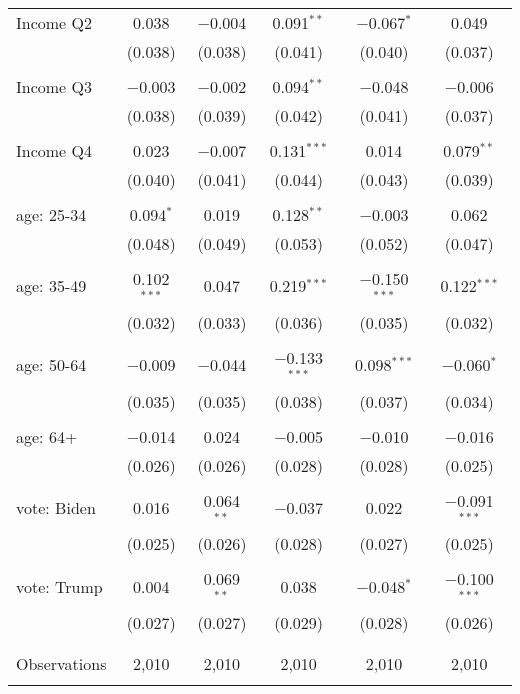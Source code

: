 \begin{tabular}{@{\extracolsep{5pt}}lccccc}
 Income Q2 & 0.038 & $-$0.004 & 0.091$^{**}$ & $-$0.067$^{*}$ & 0.049 \\ 
  & (0.038) & (0.038) & (0.041) & (0.040) & (0.037) \\ 
  & & & & & \\ 
 Income Q3 & $-$0.003 & $-$0.002 & 0.094$^{**}$ & $-$0.048 & $-$0.006 \\ 
  & (0.038) & (0.039) & (0.042) & (0.041) & (0.037) \\ 
  & & & & & \\ 
 Income Q4 & 0.023 & $-$0.007 & 0.131$^{***}$ & 0.014 & 0.079$^{**}$ \\ 
  & (0.040) & (0.041) & (0.044) & (0.043) & (0.039) \\ 
  & & & & & \\ 
 age: 25-34 & 0.094$^{*}$ & 0.019 & 0.128$^{**}$ & $-$0.003 & 0.062 \\ 
  & (0.048) & (0.049) & (0.053) & (0.052) & (0.047) \\ 
  & & & & & \\ 
 age: 35-49 & 0.102$^{***}$ & 0.047 & 0.219$^{***}$ & $-$0.150$^{***}$ & 0.122$^{***}$ \\ 
  & (0.032) & (0.033) & (0.036) & (0.035) & (0.032) \\ 
  & & & & & \\ 
 age: 50-64 & $-$0.009 & $-$0.044 & $-$0.133$^{***}$ & 0.098$^{***}$ & $-$0.060$^{*}$ \\ 
  & (0.035) & (0.035) & (0.038) & (0.037) & (0.034) \\ 
  & & & & & \\ 
 age: 64+ & $-$0.014 & 0.024 & $-$0.005 & $-$0.010 & $-$0.016 \\ 
  & (0.026) & (0.026) & (0.028) & (0.028) & (0.025) \\ 
  & & & & & \\ 
 vote: Biden & 0.016 & 0.064$^{**}$ & $-$0.037 & 0.022 & $-$0.091$^{***}$ \\ 
  & (0.025) & (0.026) & (0.028) & (0.027) & (0.025) \\ 
  & & & & & \\ 
 vote: Trump & 0.004 & 0.069$^{**}$ & 0.038 & $-$0.048$^{*}$ & $-$0.100$^{***}$ \\ 
  & (0.027) & (0.027) & (0.029) & (0.028) & (0.026) \\ 
  & & & & & \\ 
\hline \\[-1.8ex] 

Observations & 2,010 & 2,010 & 2,010 & 2,010 & 2,010 \\ 
\hline 
\hline \\[-1.8ex] 
\end{tabular} 
